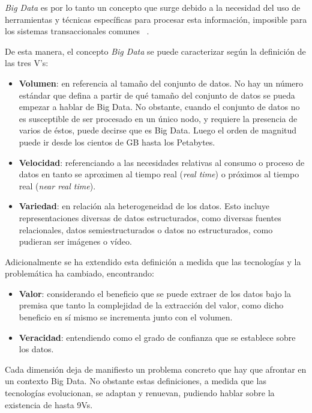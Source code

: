 \textit{Big Data} es por lo tanto un concepto que surge debido a la necesidad del
uso de herramientas y técnicas específicas para procesar esta información,
imposible para los sistemas transaccionales comunes ~\cite{BARR:que-es-big-data}.


De esta manera, el concepto \textit{Big Data} se
puede caracterizar según la definición de las tres V's:

\begin{itemize}
\item \textbf{Volumen}: en referencia al tamaño del conjunto de datos. No hay un
  número estándar que defina a partir de qué tamaño del conjunto de datos se
  pueda empezar a hablar de Big Data. No obstante, cuando el conjunto de datos
  no es susceptible de ser procesado en un único nodo, y requiere la presencia
  de varios de éstos, puede decirse que es Big Data. Luego el orden de magnitud
  puede ir desde los cientos de GB hasta los Petabytes. 
\item \textbf{Velocidad}: referenciando a las necesidades relativas al consumo o proceso
  de datos en tanto se aproximen al tiempo real (\textit{real time}) o próximos
  al tiempo real (\textit{near real time}).
\item \textbf{Variedad}: en relación ala heterogeneidad de los datos. Esto incluye
  representaciones diversas de datos estructurados, como diversas fuentes
  relacionales, datos semiestructurados o datos no estructurados, como pudieran
  ser imágenes o vídeo. 
\end{itemize}

Adicionalmente se ha extendido esta definición a medida que las tecnologías y la
problemática ha cambiado, encontrando:

\begin{itemize}
\item \textbf{Valor}: considerando el beneficio que se puede extraer de los datos bajo la
  premisa que tanto la complejidad de la extracción del valor, como dicho
  beneficio en sí mismo se incrementa junto con el volumen.
  
\item \textbf{Veracidad}: entendiendo como el grado de confianza que se establece sobre
  los datos. 
\end{itemize}

Cada dimensión deja de manifiesto un problema concreto que hay que afrontar en
un contexto Big Data. No obstante estas definiciones, a medida que las
tecnologías evolucionan, se adaptan y renuevan, pudiendo hablar sobre la
existencia de hasta 9Vs. 


